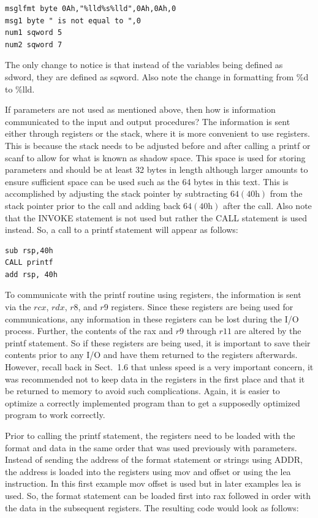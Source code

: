 \documentclass[10pt]{book}
\begin{document}
\begin{verbatim}
msglfmt byte 0Ah,"%lld%s%lld",0Ah,0Ah,0
msg1 byte " is not equal to ",0
num1 sqword 5
num2 sqword 7
\end{verbatim}

The only change to notice is that instead of the variables being defined as sdword, they are defined as sqword. Also note the change in formatting from \%d to \%lld.

If parameters are not used as mentioned above, then how is information communicated to the input and output procedures? The information is sent either through registers or the stack, where it is more convenient to use registers. This is because the stack needs to be adjusted before and after calling a printf or scanf to allow for what is known as shadow space. This space is used for storing parameters and should be at least 32 bytes in length although larger amounts to ensure sufficient space can be used such as the 64 bytes in this text. This is accomplished by adjusting the stack pointer by subtracting $64(40\mathrm{h})$ from the stack pointer prior to the call and adding back $64(40\mathrm{h})$ after the call. Also note that the INVOKE statement is not used but rather the CALL statement is used instead. So, a call to a printf statement will appear as follows:

\begin{verbatim}
sub rsp,40h
CALL printf
add rsp, 40h
\end{verbatim}

To communicate with the printf routine using registers, the information is sent via the $rcx$, $rdx$, $r8$, and $r9$ registers. Since these registers are being used for communications, any information in these registers can be lost during the I/O process. Further, the contents of the rax and $r9$ through $r11$ are altered by the printf statement. So if these registers are being used, it is important to save their contents prior to any I/O and have them returned to the registers afterwards. However, recall back in Sect.\ 1.6 that unless speed is a very important concern, it was recommended not to keep data in the registers in the first place and that it be returned to memory to avoid such complications. Again, it is easier to optimize a correctly implemented program than to get a supposedly optimized program to work correctly.

Prior to calling the printf statement, the registers need to be loaded with the format and data in the same order that was used previously with parameters. Instead of sending the address of the format statement or strings using ADDR, the address is loaded into the registers using mov and offset or using the lea instruction. In this first example mov offset is used but in later examples lea is used. So, the format statement can be loaded first into rax followed in order with the data in the subsequent registers. The resulting code would look as follows:
\end{document}
